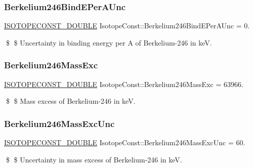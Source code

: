 \subsubsection{\texorpdfstring{Berkelium246\+Bind\+E\+Per\+A\+Unc}{Berkelium246BindEPerAUnc}}
{\footnotesize\ttfamily \mbox{\hyperlink{group___isotope_const-_macros_ga8f45a7272ce02c0b4c65c44636ed719a}{I\+S\+O\+T\+O\+P\+E\+C\+O\+N\+S\+T\+\_\+\+D\+O\+U\+B\+LE}} Isotope\+Const\+::\+Berkelium246\+Bind\+E\+Per\+A\+Unc = 0.}

\$ \$ Uncertainty in binding energy per A of Berkelium-\/246 in keV. \mbox{\label{group___isotope_const-_berkelium-_bk246_gadbef18b4059ddcf4e16de07fdeec7bd0}} 
\subsubsection{\texorpdfstring{Berkelium246\+Mass\+Exc}{Berkelium246MassExc}}
{\footnotesize\ttfamily \mbox{\hyperlink{group___isotope_const-_macros_ga8f45a7272ce02c0b4c65c44636ed719a}{I\+S\+O\+T\+O\+P\+E\+C\+O\+N\+S\+T\+\_\+\+D\+O\+U\+B\+LE}} Isotope\+Const\+::\+Berkelium246\+Mass\+Exc = 63966.}

\$ \$ Mass excess of Berkelium-\/246 in keV. \mbox{\label{group___isotope_const-_berkelium-_bk246_ga8255a38dc48f062b2527ccc2745fe96d}} 
\subsubsection{\texorpdfstring{Berkelium246\+Mass\+Exc\+Unc}{Berkelium246MassExcUnc}}
{\footnotesize\ttfamily \mbox{\hyperlink{group___isotope_const-_macros_ga8f45a7272ce02c0b4c65c44636ed719a}{I\+S\+O\+T\+O\+P\+E\+C\+O\+N\+S\+T\+\_\+\+D\+O\+U\+B\+LE}} Isotope\+Const\+::\+Berkelium246\+Mass\+Exc\+Unc = 60.}

\$ \$ Uncertainty in mass excess of Berkelium-\/246 in keV. \mbox{\label{group___isotope_const-_berkelium-_bk246_ga1e301c1d7d131420f6265bfc80475f3c}} 
